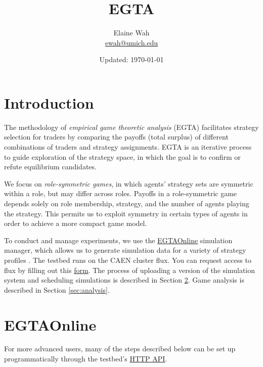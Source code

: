 \documentclass[11pt]{article}
\begin{document}
	
\title{EGTA}
\author{
  Elaine Wah \\
  \href{mailto:ewah@umich.edu}{ewah@umich.edu}
}
\date{Updated: \today}
\maketitle

\section{Introduction}

The methodology of \emph{empirical game theoretic analysis} (EGTA) \citep{Wellman2006} facilitates strategy selection for traders by comparing the payoffs (total surplus) of different combinations of traders and strategy assignments. EGTA is an iterative process to guide exploration of the strategy space, in which the goal is to confirm or refute equilibrium candidates.

We focus on \emph{role-symmetric games}, in which agents' strategy sets are symmetric within a role, but may differ across roles.
Payoffs in a role-symmetric game depends solely on role membership, strategy, and the number of agents playing the strategy. This permits us to exploit symmetry in certain types of agents in order to achieve a more compact game model.

To conduct and manage experiments, we use the \href{http://egtaonline.eecs.umich.edu}{EGTAOnline} simulation manager, which allows us to generate simulation data for a variety of strategy profiles \citep{Cassell2013}.
The testbed runs on the CAEN cluster flux. You can request access to flux by filling out this \href{https://docs.google.com/a/umich.edu/forms/d/1u9hdqdinnNC9iF6If2xV0C06knbP_TKJBIzfCSnWw6I/viewform}{form}.
The process of uploading a version of the simulation system and scheduling simulations is described in Section \ref{sec:egta}.
Game analysis is described in Section \ref{sec:analysis}.

\section{EGTAOnline}
\label{sec:egta}

For more advanced users, many of the steps described below can be set up programmatically through the testbed's \href{https://github.com/bcassell/egtaonline3/wiki/API}{HTTP API}.
\end{document}
